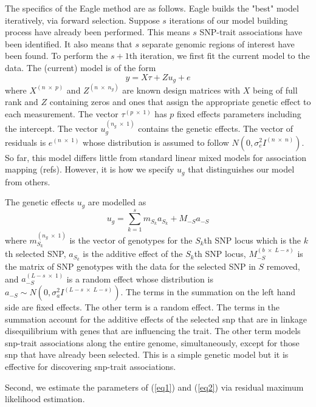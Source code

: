 \documentclass{article}
\begin{document}
The specifics of the Eagle method are as follows. 
Eagle builds the "best" model iteratively, via forward selection. 
Suppose $s$ iterations of our model building process have already been performed. This means $s$ SNP-trait 
associations have been identified.  It also means that $s$ separate genomic regions of interest have been found.  
To perform the $s+1$th  iteration, we first fit the current model to the data. 
The (current) model is of the form 
\begin{equation}
\label{eq1}
y = X \tau + Z u_g + e
\end{equation}
where 
$X^{(n \; \times \; p)}$ and $Z^{( n \; \times \; n_g)}$ are known design matrices with $X$ being of full rank and $Z$ 
containing zeros and ones that assign the appropriate genetic effect to each measurement. 
The vector 
$\tau^{(p \; \times \; 1)}$ has $p$ fixed effects parameters including the intercept. The vector 
$u_g^{(n_g \; \times \; 1)}$ contains the 
genetic effects. The vector of residuals is 
$e^{(n \; \times \;1)}$ whose distribution is assumed to follow $N(0, \sigma^2_e I^{(n \; \times \; n)})$. 
So far,  this model differs little from standard linear mixed models for association mapping (refs). 
However, 
it is how we specify $u_g$ that distinguishes our model from others. 

The genetic effects $u_g$ are modelled as 
\begin{equation}
\label{eq2}
u_g = \sum_{k=1}^s  m_{S_k} a_{S_k} + M_{-S} a_{-S}
\end{equation}
where $m_{S_k}^{(n_g \; \times \; 1)}$ is the vector of genotypes for the $S_k$th SNP locus which is the $k$th selected SNP, 
$a_{S_k}$ is the additive effect of the $S_k$th SNP locus, $M_{-S}^{(b \; \times \; L-s)}$ is the matrix of  SNP genotypes 
with the data for the selected SNP in $S$ removed,  and $a_{-S}^{(L-s \; \times  \; 1)}$ is a random effect whose distribution is 
$a_{-S} \sim N(0, \sigma_a^2 I^{(L-s \; \times \;  L-s)})$. 
The terms in the summation on the left hand side are fixed effects.  The other term is a random effect.  The terms 
in the summation account 
for the additive effects of the selected snp that are in linkage disequilibrium with genes that are influencing the trait. The other term models 
snp-trait associations along the entire genome, simultaneously, except for those snp that have already been selected. 
This is a simple genetic model but it 
is effective for discovering snp-trait associations. 


Second, we estimate the parameters of (\ref{eq1}) and (\ref{eq2}) via residual maximum likelihood estimation. 
\end{document}

